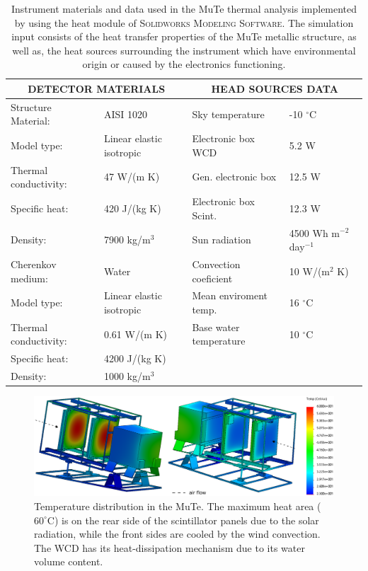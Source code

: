 \documentclass[letterpaper,11pt]{article}
\begin{document}
\begin{table}
\begin{center}
\begin{tabular}{ll|ll}
\hline
\multicolumn{2}{c}{\bf DETECTOR MATERIALS} & \multicolumn{2}{|c}{\bf HEAD SOURCES DATA}\\
\hline
Structure Material: & AISI 1020 & Sky temperature & -10 $^{\circ}$C \\
Model type: & Linear elastic isotropic & Electronic box WCD & 5.2 W \\
Thermal conductivity: & 47 W/(m K) & Gen. electronic box & 12.5 W \\
Specific heat: & 420 J/(kg K) & Electronic box Scint. & 12.3 W \\
Density: & 7900 kg/m$^3$ & Sun radiation & 4500 Wh m$^{-2}$ day$^{-1}$ \\
Cherenkov medium: & Water & Convection coeficient & 10 W/(m$^2$ K) \\
Model type: & Linear elastic isotropic & Mean enviroment temp. & 16 $^{\circ}$C \\
Thermal conductivity: & 0.61 W/(m K) & Base water temperature & 10 $^{\circ}$C \\
Specific heat: & 4200 J/(kg K) & & \\
Density: & 1000 kg/m$^3$ & & \\ 
\hline
\end{tabular}
\end{center}
\caption{Instrument materials and data used in the MuTe thermal analysis implemented by using the heat module of \textsc{Solidworks Modeling Software}. The simulation input consists of the heat transfer properties of the MuTe metallic structure, as well as, the heat sources surrounding the instrument which have environmental origin or  caused by the electronics functioning. }
\label{instr_mat}
\end{table}

\begin{figure}[htb]
\centering
\includegraphics[width=1\columnwidth]{Figures/MuTe_Temp.eps}
\caption{Temperature distribution in the MuTe. The maximum heat area ($60^{\circ}$C) is on the rear side of the scintillator panels due to the solar radiation, while the front sides are cooled by the wind convection. The WCD has its heat-dissipation mechanism due to its water volume content.}
\label{fig:temp_graph}
\end{figure}
\end{document}

